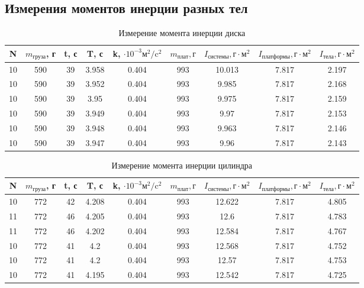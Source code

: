 \documentclass[a4, 12pt]{article}
\begin{document}
\subsection{Измерения моментов инерции разных тел}
\begin{table} \label{Диск} \caption{Измерение момента инерции диска} \begin{tabular}{|c|c|c|c|c|c|c|c|c|} \hline N & $m_\text{груза}$, г & t, с & T, с & k, $\cdot 10^{-3}\text{м}^2/\text{c}^2$ & $m_\text{плат}, г$ & $I_\text{системы}, \text{г}\cdot \text{м}^2$ &$I_\text{платформы}, \text{г}\cdot \text{м}^2$ & $I_\text{тела}, \text{г}\cdot \text{м}^2$ \\ \hline 10 & 590 & 39 & 3.958 & 0.404 & 993 & 10.013 & 7.817 & 2.197 \\ \hline 10 & 590 & 39 & 3.952 & 0.404 & 993 & 9.985 & 7.817 & 2.168 \\ \hline 10 & 590 & 39 & 3.95 & 0.404 & 993 & 9.975 & 7.817 & 2.159 \\ \hline 10 & 590 & 39 & 3.949 & 0.404 & 993 & 9.97 & 7.817 & 2.153 \\ \hline 10 & 590 & 39 & 3.948 & 0.404 & 993 & 9.963 & 7.817 & 2.146 \\ \hline 10 & 590 & 39 & 3.947 & 0.404 & 993 & 9.96 & 7.817 & 2.143 \\ \hline \end{tabular} \end{table}

\begin{table} \label{Цилиндр} \caption{Измерение момента инерции цилиндра} \begin{tabular}{|c|c|c|c|c|c|c|c|c|} \hline N & $m_\text{груза}$, г & t, с & T, с & k, $\cdot 10^{-3}\text{м}^2/\text{c}^2$ & $m_\text{плат}, г$ & $I_\text{системы}, \text{г}\cdot \text{м}^2$ &$I_\text{платформы}, \text{г}\cdot \text{м}^2$ & $I_\text{тела}, \text{г}\cdot \text{м}^2$ \\ \hline 10 & 772 & 42 & 4.208 & 0.404 & 993 & 12.622 & 7.817 & 4.805 \\ \hline 11 & 772 & 46 & 4.205 & 0.404 & 993 & 12.6 & 7.817 & 4.783 \\ \hline 11 & 772 & 46 & 4.202 & 0.404 & 993 & 12.584 & 7.817 & 4.767 \\ \hline 10 & 772 & 41 & 4.2 & 0.404 & 993 & 12.568 & 7.817 & 4.752 \\ \hline 10 & 772 & 41 & 4.2 & 0.404 & 993 & 12.57 & 7.817 & 4.753 \\ \hline 10 & 772 & 41 & 4.195 & 0.404 & 993 & 12.542 & 7.817 & 4.725 \\ \hline \end{tabular} \end{table}
\end{document}
